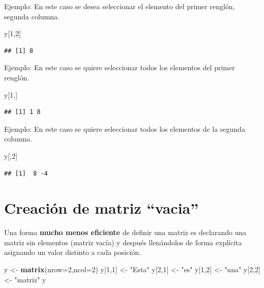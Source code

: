 \documentclass[
]{book}
\newenvironment{Shaded}{\begin{snugshade}}{\end{snugshade}}
\newcommand{\AttributeTok}[1]{\textcolor[rgb]{0.13,0.29,0.53}{#1}}
\newcommand{\DecValTok}[1]{\textcolor[rgb]{0.00,0.00,0.81}{#1}}
\newcommand{\FunctionTok}[1]{\textcolor[rgb]{0.13,0.29,0.53}{\textbf{#1}}}
\newcommand{\NormalTok}[1]{#1}
\newcommand{\OtherTok}[1]{\textcolor[rgb]{0.56,0.35,0.01}{#1}}
\newcommand{\StringTok}[1]{\textcolor[rgb]{0.31,0.60,0.02}{#1}}
\begin{document}
Ejemplo: En este caso se desea seleccionar el elemento del primer renglón, segunda columna.

\begin{Shaded}
\begin{Highlighting}[]
\NormalTok{y[}\DecValTok{1}\NormalTok{,}\DecValTok{2}\NormalTok{]}
\end{Highlighting}
\end{Shaded}

\begin{verbatim}
## [1] 8
\end{verbatim}

Ejemplo: En este caso se quiere seleccionar todos los elementos del primer renglón.

\begin{Shaded}
\begin{Highlighting}[]
\NormalTok{y[}\DecValTok{1}\NormalTok{,]}
\end{Highlighting}
\end{Shaded}

\begin{verbatim}
## [1] 1 8
\end{verbatim}

Ejemplo: En este caso se quiere seleccionar todos los elementos de la segunda columna.

\begin{Shaded}
\begin{Highlighting}[]
\NormalTok{y[,}\DecValTok{2}\NormalTok{]}
\end{Highlighting}
\end{Shaded}

\begin{verbatim}
## [1]  8 -4
\end{verbatim}

\hypertarget{creaciuxf3n-de-matriz-vacia}{%
\section{Creación de matriz ``vacia''}\label{creaciuxf3n-de-matriz-vacia}}

Una forma \textbf{mucho menos eficiente} de definir una matriz es declarando una matriz sin elementos (matriz vacía) y después llenándolos de forma explícita asignando un valor distinto a cada posición.

\begin{Shaded}
\begin{Highlighting}[]
\NormalTok{ y }\OtherTok{\textless{}{-}} \FunctionTok{matrix}\NormalTok{(}\AttributeTok{nrow=}\DecValTok{2}\NormalTok{,}\AttributeTok{ncol=}\DecValTok{2}\NormalTok{)}
\NormalTok{y[}\DecValTok{1}\NormalTok{,}\DecValTok{1}\NormalTok{] }\OtherTok{\textless{}{-}} \StringTok{"Esta"}
\NormalTok{y[}\DecValTok{2}\NormalTok{,}\DecValTok{1}\NormalTok{] }\OtherTok{\textless{}{-}} \StringTok{"es"}
\NormalTok{y[}\DecValTok{1}\NormalTok{,}\DecValTok{2}\NormalTok{] }\OtherTok{\textless{}{-}} \StringTok{"una"}
\NormalTok{y[}\DecValTok{2}\NormalTok{,}\DecValTok{2}\NormalTok{] }\OtherTok{\textless{}{-}} \StringTok{"matriz"}
\NormalTok{y}
\end{Highlighting}
\end{Shaded}
\end{document}
